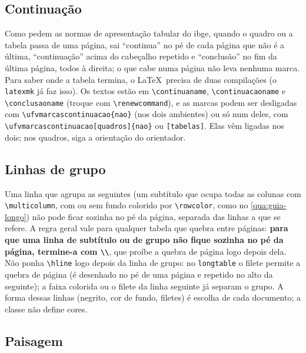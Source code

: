 
\subsection{Continuação}

Como pedem as normas de apresentação tabular do \ac{ibge}, quando o
quadro ou a tabela passa de uma página, sai ``continua'' no pé de cada página que não é a
última, ``continuação'' acima do cabeçalho repetido e ``conclusão'' no fim da última página,
todos à direita; o que cabe numa página não leva nenhuma marca. Para saber onde a tabela
termina, o \LaTeX\ precisa de duas compilações (o \texttt{latexmk} já faz isso). Os textos
estão em \texttt{\textbackslash continuaname}, \texttt{\textbackslash continuacaoname} e
\texttt{\textbackslash conclusaoname} (troque com \texttt{\textbackslash renewcommand}), e as
marcas podem ser desligadas com
\texttt{\textbackslash ufvmarcascontinuacao\{nao\}} (nos dois ambientes) ou só num deles,
com \texttt{\textbackslash ufvmarcascontinuacao[quadros]\{nao\}} ou
\texttt{[tabelas]}. Elas vêm ligadas nos dois; nos quadros, siga a orientação do
orientador.

\subsection{Linhas de grupo}

Uma linha que agrupa as seguintes (um subtítulo que ocupa
todas as colunas com \texttt{\textbackslash multicolumn}, com ou sem fundo colorido por
\texttt{\textbackslash rowcolor}, como no \autoref{qua:guia-longo}) não pode ficar sozinha no pé da
página, separada das linhas a que se refere. A regra geral vale para qualquer tabela que
quebra entre páginas: \textbf{para que uma linha de subtítulo ou de grupo não fique sozinha
no pé da página, termine-a com \texttt{\textbackslash\textbackslash*}}, que proíbe a quebra
de página logo depois dela. Não ponha \texttt{\textbackslash hline} logo depois da linha
de grupo: no \texttt{longtable} o filete permite a quebra de página (é desenhado no pé de uma
página e repetido no alto da seguinte); a faixa colorida ou o filete da linha seguinte já
separam o grupo. A forma dessas linhas (negrito, cor de fundo, filetes) é escolha
de cada documento; a classe não define cores.

\subsection{Paisagem}

